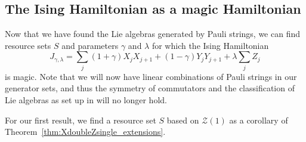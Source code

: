 \documentclass[12pt, a4-paper]{amsart}
\newcommand{\cZ}{\mathcal{Z}}
\numberwithin{equation}{section}
\begin{document}
\subsection{The Ising Hamiltonian as a magic Hamiltonian}\label{sec:Ising_Lie}
Now that we have found the Lie algebras generated by Pauli strings, we can find resource sets $S$ and parameters $\gamma$ and $\lambda$ for which the Ising Hamiltonian
\begin{equation}\label{eq:Ising_Ham}
    J_{\gamma, \lambda} = \sum_j (1+\gamma) X_j X_{j+1} + (1-\gamma)Y_j Y_{j+1} + \lambda \sum_j Z_j
\end{equation}
is magic. Note that we will now have linear combinations of Pauli strings in our generator sets, and thus the symmetry of commutators and the classification of Lie algebras as set up in \cite{Aguilar2024FullClassificationLie} will no longer hold. 

For our first result, we find a resource set $S$ based on $\cZ(1)$ as a corollary of Theorem~\ref{thm:XdoubleZsingle_extensions}.
\end{document}
